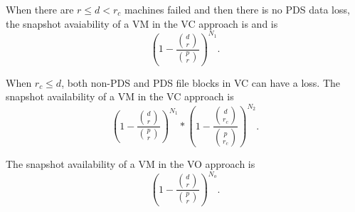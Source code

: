 When there are $r \le d<r_c$ machines failed and then there is no PDS data loss,  
the snapshot avaiability of a VM in the VC approach is 
and is
\[
(1-\frac{\binom{d}{r}} { \binom{p}{r} })^{N_1}.
\]

When $r_c \leq d$, both non-PDS and PDS file blocks in VC can have a loss.
The snapshot availability of  a VM in the VC approach is
\[
(1-\frac{ \binom{d}{r}} { \binom{p}{r} })^{N_1} 
*
(1-\frac{ \binom{d}{r_c}} { \binom{p}{r_c} })^{N_2}.
\]

The snapshot availability of a VM  in the VO approach is
\[ 
(1-\frac{ \binom{d}{r}} { \binom{p}{r} })^{N_o}. 
\]





